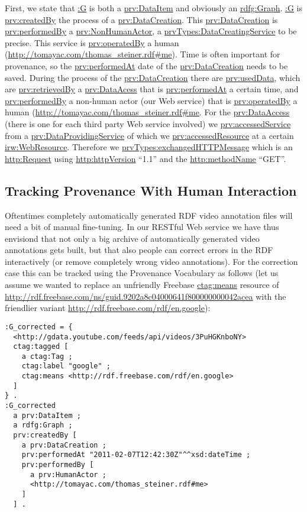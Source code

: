 \documentclass{acm_proc_article-sp}
\begin{document}
First, we state that \url{:G} is both a \url{prv:DataItem} and obviously an \url{rdfg:Graph}. \url{:G} is \url{prv:createdBy} the process of a \url{prv:DataCreation}. This \url{prv:DataCreation} is \url{prv:performedBy} a \url{prv:NonHumanActor}, a 
\url{prvTypes:DataCreatingService} to be precise. This service is \url{prv:operatedBy} a human (\url{http://tomayac.com/thomas_steiner.rdf#me}). Time is often important for provenance, so the \url{prv:performedAt} date of the \url{prv:DataCreation} needs to be saved. During the process of the \url{prv:DataCreation} there are \url{prv:usedData}, which are \url{prv:retrievedBy} a \url{prv:DataAcess} that is \url{prv:performedAt} a certain time, and \url{prv:performedBy} a non-human actor (our Web service) that is \url{prv:operatedBy} a human (\url{http://tomayac.com/thomas_steiner.rdf#me}. For the \url{prv:DataAccess} (there is one for each third party Web service involved) we \url{prv:accessedService} from a \url{prv:DataProvidingService} of which we \url{prv:accessedResource} at a certain \url{irw:WebResource}. Therefore we \url{prvTypes:exchangedHTTPMessage} which is an \url{http:Request} using \url{http:httpVersion} ``1.1'' and the \url{http:methodName} ``GET''.

\subsection{Tracking Provenance With Human Interaction}\label{sec:human}
Oftentimes completely automatically generated RDF video annotation files will need a bit of manual fine-tuning. In our RESTful Web service we have thus envisiond that not only a big archive of automatically generated video annotations gets built, but that also people can correct errors in the RDF interactively (or remove completely wrong video annotations). For the correction case this can be tracked using the Provenance Vocabulary as follows (let us assume we wanted to replace an unfriendly Freebase \url{ctag:means} resource of \url{http://rdf.freebase.com/ns/guid.9202a8c04000641f800000000042acea} with the friendlier variant \url{http://rdf.freebase.com/rdf/en.google}):
\begin{lstlisting}
:G_corrected = {
  <http://gdata.youtube.com/feeds/api/videos/3PuHGKnboNY> 
  ctag:tagged [
    a ctag:Tag ;
    ctag:label "google" ;
    ctag:means <http://rdf.freebase.com/rdf/en.google> 
  ]  
} .
:G_corrected
  a prv:DataItem ;
  a rdfg:Graph ;
  prv:createdBy [
    a prv:DataCreation ;
    prv:performedAt "2011-02-07T12:42:30Z"^^xsd:dateTime ;
    prv:performedBy [
      a prv:HumanActor ;
      <http://tomayac.com/thomas_steiner.rdf#me> 
    ] 
  ] .
\end{lstlisting}
\end{document}
